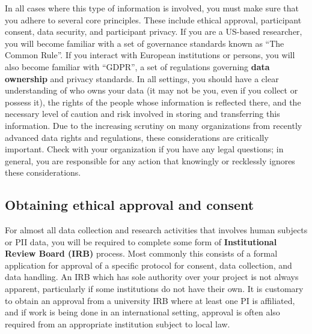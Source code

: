In all cases where this type of information is involved,
you must make sure that you adhere to several core principles.
These include ethical approval, participant consent, data security, and participant privacy.
If you are a US-based researcher, you will become familiar
with a set of governance standards known as ``The Common Rule''.
If you interact with European institutions or persons,
you will also become familiar with ``GDPR'',
a set of regulations governing \textbf{data ownership} and privacy standards.
In all settings, you should have a clear understanding of
who owns your data (it may not be you, even if you collect or possess it),
the rights of the people whose information is reflected there,
and the necessary level of caution and risk involved in
storing and transferring this information.
Due to the increasing scrutiny on many organizations
from recently advanced data rights and regulations,
these considerations are critically important.
Check with your organization if you have any legal questions;
in general, you are responsible for any action that
knowingly or recklessly ignores these considerations.

\subsection{Obtaining ethical approval and consent}

For almost all data collection and research activities that involves
human subjects or PII data,
you will be required to complete some form of \textbf{Institutional Review Board (IRB)} process.
Most commonly this consists of a formal application for approval of a specific
protocol for consent, data collection, and data handling.
An IRB which has sole authority over your project is not always apparent,
particularly if some institutions do not have their own.
It is customary to obtain an approval from a university IRB
where at least one PI is affiliated,
and if work is being done in an international setting,
approval is often also required
from an appropriate institution subject to local law.

